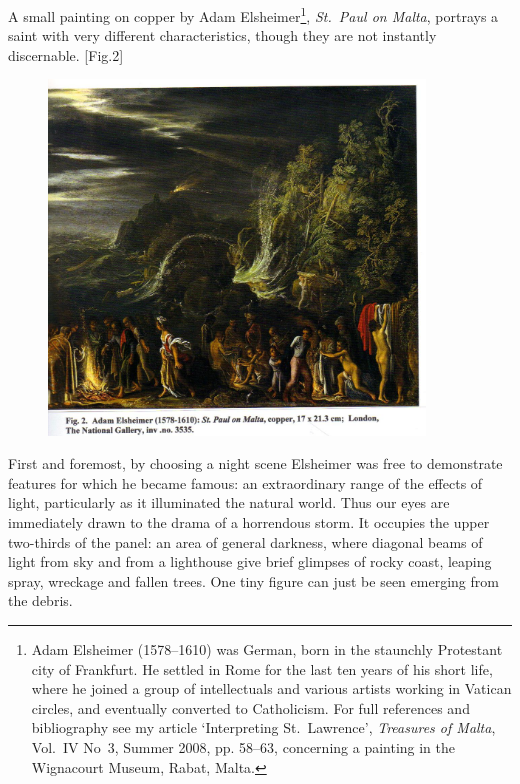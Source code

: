 \documentclass[a4paper,12pt]{article}
\begin{document}
A small painting on copper by Adam Elsheimer\footnote{Adam Elsheimer
  (1578--1610) was German, born in the staunchly Protestant city of
  Frankfurt.  He settled in Rome for the last ten years of his short
  life, where he joined a group of intellectuals and various artists
  working in Vatican circles, and eventually converted to Catholicism.
  For full references and bibliography see my article `Interpreting
  St.~Lawrence', \textit{Treasures of Malta}, Vol.~IV No~3, Summer
  2008, pp. 58--63, concerning a painting in the Wignacourt Museum,
  Rabat, Malta. }, \textit{St.~Paul on Malta}, portrays a saint with
very different characteristics, though they are not instantly
discernable. [Fig.2]
\begin{figure}[htbp]
\centering
\includegraphics[width=10cm]{fig2.jpg}
\end{figure}
First and foremost, by choosing a night scene
Elsheimer was free to demonstrate features for which he became famous:
an extraordinary range of the effects of light, particularly as it
illuminated the natural world.  Thus our eyes are immediately drawn to
the drama of a horrendous storm.  It occupies the upper two-thirds of
the panel: an area of general darkness, where diagonal beams of light
from sky and from a lighthouse give brief glimpses of rocky coast,
leaping spray, wreckage and fallen trees.  One tiny figure can just be
seen emerging from the debris.
\end{document}
